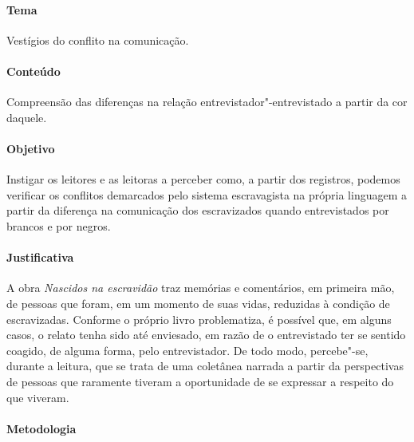 \documentclass[11pt]{extarticle}
\begin{document}
\paragraph{Tema} Vestígios do conflito na comunicação.


\paragraph{Conteúdo} Compreensão das diferenças na relação entrevistador"-entrevistado
a partir da cor daquele.


\paragraph{Objetivo} Instigar os leitores e as leitoras a perceber como, a partir dos registros,
podemos verificar os conflitos demarcados pelo sistema escravagista na própria linguagem a partir
da diferença na comunicação dos escravizados quando entrevistados por brancos e por negros.

\paragraph{Justificativa} A obra \emph{Nascidos na escravidão} traz memórias e
comentários, em primeira mão, de pessoas que foram, em um momento de
suas vidas, reduzidas à condição de escravizadas. Conforme o próprio
livro problematiza, é possível que, em alguns casos, o relato tenha sido
até enviesado, em razão de o entrevistado ter se sentido coagido, de
alguma forma, pelo entrevistador. De todo modo, percebe"-se, durante a
leitura, que se trata de uma coletânea narrada a partir da perspectivas
de pessoas que raramente tiveram a oportunidade de se expressar a
respeito do que viveram.


\paragraph{Metodologia}
\end{document}
